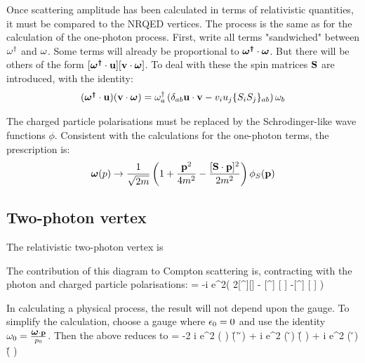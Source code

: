 Once scattering amplitude has been calculated in terms of relativistic quantities, it must be compared to the NRQED vertices.  The process is the same as for the calculation of the one-photon process.  First, write all terms "sandwiched" between $\omega^\dagger$ and $\omega$.  Some terms will already be proportional to $\mbox{\boldmath$ \omega^\dagger $} \cdot \mbox{\boldmath$ \omega $}$.  But there will be others of the form $[\mbox{\boldmath$ \omega^\dagger $} \cdot \mathbf{u}] [\mathbf{v} \cdot \mbox{\boldmath$ \omega $}]$.  To deal with these the spin matrices $\mathbf{S}$ are introduced, with the identity:
\[
	(\mbox{\boldmath$ \omega^\dagger $} \cdot \mathbf{u}) (\mathbf{v} \cdot \mbox{\boldmath$ \omega $}) = \omega^\dagger_a \left( \delta_{ab} \mathbf{u} \cdot \mathbf{v} - v_i u_j\{S_i S_j\}_{ab}  \right) \omega_b
\]

The charged particle polarisations must be replaced by the Schrodinger-like wave functions $\phi$.  Consistent with the calculations for the one-photon terms, the prescription is:
\[
	\mbox{\boldmath$ \omega $}(p) \to \frac{1}{\sqrt{2m}}\left( 1 + \frac{\mathbf{p}^2}{4m^2} - \frac{ [\mathbf{S}\cdot \mathbf{p}]^2 } {2m^2} \right)\phi_S(\mathbf{p})
\]




\subsection{Two-photon vertex}

The relativistic two-photon vertex is


The contribution of this diagram to Compton scattering is, contracting with the photon and charged particle polarisations:
\beq
\Mcontact = 
	 -i e^2( 2[\W^\dagger \cdot \W][\Adag \cdot \A] - [\W^\dagger \cdot \A] [ \W \cdot \Adag]  -[\W^\dagger \cdot \Adag] [ \W \cdot \A] )
\eeq




In calculating a physical process, the result will not depend upon the gauge.  To simplify the calculation, choose a gauge where $\epsilon_0 = 0$ and use the identity $\omega_0 = \frac{\mbox{\boldmath$ \omega $} \cdot \mathbf{p}}{p_0}$.  Then the above reduces to
\beq
\Mcontact =  -2 i e^2 (\gv{\W^\dagger} \cdot \gv{\W}) (\v{\A}' \cdot \v{\A}) 
	+  i e^2 (\gv{\W^\dagger} \cdot  \v{\A}) (\v{\Adag} \cdot \gv{\W})	
	+  i e^2 (\gv{\W^\dagger} \cdot  \v{\Adag}) (\v{\A} \cdot \gv{\W})	
\eeq



